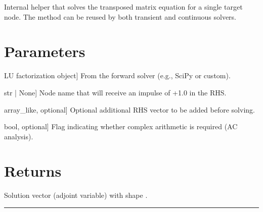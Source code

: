 \documentclass[letterpaper,10pt,english]{sphinxmanual}
\begin{document}
\begin{fulllineitems}
\label{\detokenize{adjoint_engine:AdjointEngine._solve_adjoint}}
\pysigstartsignatures
\pysiglinewithargsret
{}
{\sphinxparamcomma {}\sphinxparamcomma {}\sphinxparamcomma {}}
{}
\pysigstopsignatures
\sphinxAtStartPar
Internal helper that solves the transposed matrix equation for a single target node.
The method can be reused by both transient and continuous solvers.


\section{Parameters}
\label{\detokenize{adjoint_engine:parameters}}\begin{description}
\sphinxlineitem{lu}{[}LU factorization object{]}
\sphinxAtStartPar
From the forward solver (e.g., SciPy or custom).

\sphinxlineitem{target}{[}str | None{]}
\sphinxAtStartPar
Node name that will receive an impulse of +1.0 in the RHS.

\sphinxlineitem{base\_rhs}{[}array\_like, optional{]}
\sphinxAtStartPar
Optional additional RHS vector to be added before solving.

\sphinxlineitem{is\_complex}{[}bool, optional{]}
\sphinxAtStartPar
Flag indicating whether complex arithmetic is required (AC analysis).

\end{description}


\section{Returns}
\label{\detokenize{adjoint_engine:returns}}\begin{description}
\sphinxAtStartPar
Solution vector  (adjoint variable) with shape .

\end{description}

\end{fulllineitems}



\bigskip\hrule\bigskip
\end{document}
